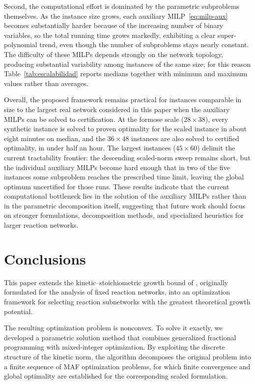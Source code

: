 \documentclass[a4paper,11pt,reqno]{amsart}
\begin{document}
Second, the computational effort is dominated by the parametric subproblems
themselves. As the instance size grows, each auxiliary MILP~\eqref{eq:milp-aux}
becomes substantially harder because of the increasing number of binary variables,
so the total running time grows markedly,  exhibiting a clear super-polynomial
trend, even though the number of subproblems stays nearly constant. The
difficulty of these MILPs depends strongly on the network topology, producing
substantial variability among instances of the same size; for this reason
Table~\ref{tab:escalabilidad} reports medians together with minimum and maximum
values rather than averages.

Overall, the proposed framework remains practical for instances comparable in
size to the largest real network considered in this paper when the auxiliary
MILPs can be solved to certification. At the formose scale ($28\times38$), every
synthetic instance is solved to proven optimality for the scaled instance in
about eight minutes on median, and the $36\times48$ instances are also solved
to certified optimality, in under half an hour. The largest instances
($45\times60$) delimit the current tractability frontier: the descending
scaled-norm sweep remains short, but the individual auxiliary MILPs become hard
enough that in two of the five instances some subproblem reaches the prescribed
time limit, leaving the global optimum uncertified for those runs. 
These results indicate that the current computational bottleneck lies in the
solution of the auxiliary MILPs rather than in the parametric decomposition
itself, suggesting that future work should focus on stronger formulations,
decomposition methods, and specialized heuristics for larger reaction
networks.


\section{Conclusions}
\label{sec:conc}

This paper extends the kinetic--stoichiometric growth bound of
\citet{gagrani2026topological}, originally formulated for the analysis of
fixed reaction networks, into an optimization framework for selecting
reaction subnetworks with the greatest theoretical growth potential.

The resulting optimization problem is nonconvex. To solve it exactly, we
developed a parametric solution method that combines generalized fractional
programming with mixed-integer optimization. By exploiting the discrete
structure of the kinetic norm, the algorithm decomposes the original problem
into a finite sequence of MAF optimization problems, for which finite
convergence and global optimality are established for the corresponding scaled
formulation.
\end{document}
